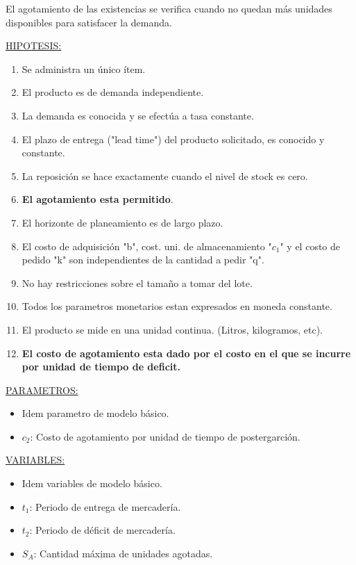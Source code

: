 \documentclass{article}
\begin{document}
El agotamiento de las existencias se verifica cuando no quedan más unidades disponibles para satisfacer la demanda.

\noindent
\underline{HIPOTESIS:}
\begin{enumerate}
    \item Se administra un único ítem.
    \item El producto es de demanda independiente.
    \item La demanda es conocida y se efectúa a tasa constante.
    \item El plazo de entrega ("lead time") del producto solicitado, es conocido y constante.
    \item La reposición se hace exactamente cuando el nivel de stock es cero.
    \item \textbf{El agotamiento esta permitido}. 
    \item El horizonte de planeamiento es de largo plazo.
    \item El costo de adquisición "b", cost. uni. de almacenamiento "\(c_1\)" y el costo de pedido "k" son independientes de la cantidad a pedir "q".
    \item No hay restricciones sobre el tamaño a tomar del lote.
    \item Todos los parametros monetarios estan expresados en moneda constante.
    \item El producto se mide en una unidad continua. (Litros, kilogramos, etc).
    \item \textbf{El costo de agotamiento esta dado por el costo en el que se incurre por unidad de tiempo de deficit.}
\end{enumerate}

\noindent
\underline{PARAMETROS:}
\begin{itemize}
    \item Idem parametro de modelo básico.
    \item \(c_2\): Costo de agotamiento por unidad de tiempo de postergarción.
\end{itemize}

\noindent
\underline{VARIABLES:}
\begin{itemize}
    \item Idem variables de modelo básico.
    \item \(t_1\): Periodo de entrega de mercadería.
    \item \(t_2\): Periodo de déficit de mercadería.
    \item \(S_A\): Cantidad máxima de unidades agotadas.
\end{itemize}
\end{document}
